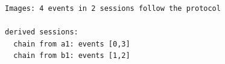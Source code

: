 \begin{lstlisting}[language={},basicstyle=\ttfamily\footnotesize,breaklines=true]
Images: 4 events in 2 sessions follow the protocol

derived sessions:
  chain from a1: events [0,3]
  chain from b1: events [1,2]
\end{lstlisting}
